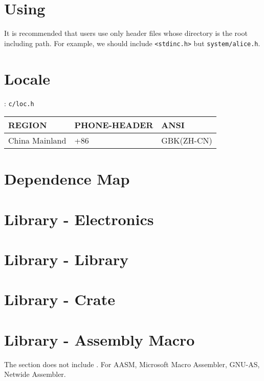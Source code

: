 \section{Using}

It is recommended that users use only header files whose directory is the root including path. For example, we should include \verb`<stdinc.h>` but \verb|system/alice.h|.


\section{Locale}
: \verb`c/loc.h`

\begin{center}\begin{table}[h!]
	\begin{tabular}{|l|l|l|}
	\hline
	\rowcolor[rgb]{0.95, 0.975, 1}\textbf{REGION} & \textbf{PHONE-HEADER} & \textbf{ANSI} \\ \hline
	China Mainland & +86 & GBK(ZH-CN) \\ \hline
	\end{tabular}
\end{table}\end{center}

\section{Dependence Map}

\section{Library \mbox{-} Electronics}

\section{Library \mbox{-}  Library}

\section{Library \mbox{-}  Crate}

\section{Library \mbox{-} Assembly Macro}

The section does not include . For AASM, Microsoft Macro Assembler, GNU-AS, Netwide Assembler.

